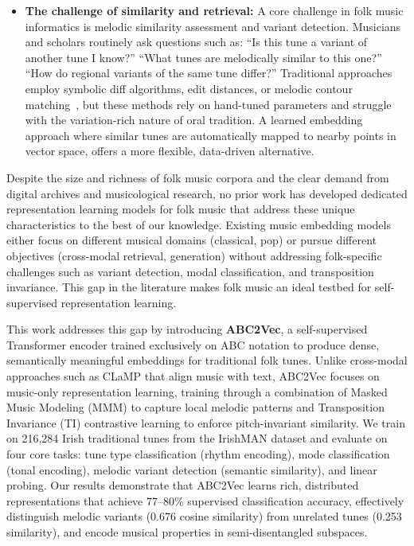 \documentclass[]{interact}
\theoremstyle{plain}
\theoremstyle{definition}
\theoremstyle{remark}
\begin{document}
\begin{itemize}
\item \textbf{The challenge of similarity and retrieval:} A core challenge in folk music informatics is melodic similarity assessment and variant detection. Musicians and scholars routinely ask questions such as: ``Is this tune a variant of another tune I know?'' ``What tunes are melodically similar to this one?'' ``How do regional variants of the same tune differ?'' Traditional approaches employ symbolic diff algorithms, edit distances, or melodic contour matching~\cite{FolkMusicVariation2017,FolkMusicAnalysis2020}, but these methods rely on hand-tuned parameters and struggle with the variation-rich nature of oral tradition. A learned embedding approach where similar tunes are automatically mapped to nearby points in vector space, offers a more flexible, data-driven alternative.
\end{itemize}

Despite the size and richness of folk music corpora and the clear demand from digital archives and musicological research, no prior work has developed dedicated representation learning models for folk music that address these unique characteristics to the best of our knowledge. Existing music embedding models either focus on different musical domains (classical, pop) or pursue different objectives (cross-modal retrieval, generation) without addressing folk-specific challenges such as variant detection, modal classification, and transposition invariance. This gap in the literature makes folk music an ideal testbed for self-supervised representation learning.

This work addresses this gap by introducing \textbf{ABC2Vec}, a self-supervised Transformer encoder trained exclusively on ABC notation to produce dense, semantically meaningful embeddings for traditional folk tunes. Unlike cross-modal approaches such as CLaMP that align music with text, ABC2Vec focuses on music-only representation learning, training through a combination of Masked Music Modeling (MMM) to capture local melodic patterns and Transposition Invariance (TI) contrastive learning to enforce pitch-invariant similarity. We train on 216,284 Irish traditional tunes from the IrishMAN dataset and evaluate on four core tasks: tune type classification (rhythm encoding), mode classification (tonal encoding), melodic variant detection (semantic similarity), and linear probing. Our results demonstrate that ABC2Vec learns rich, distributed representations that achieve 77--80\% supervised classification accuracy, effectively distinguish melodic variants (0.676 cosine similarity) from unrelated tunes (0.253 similarity), and encode musical properties in semi-disentangled subspaces.
\end{document}
